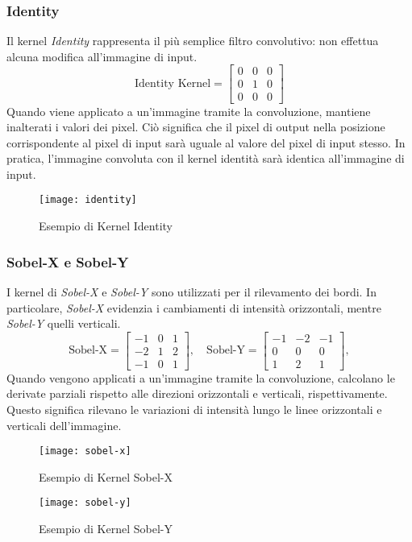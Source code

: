 \subsubsection{Identity}
Il kernel \textit{Identity} rappresenta il più semplice filtro convolutivo: non effettua alcuna modifica all'immagine di input.\newline
\begin{equation*}
	\text {Identity Kernel} = 
	\begin{bmatrix}
		0 & 0 & 0 \\
		0 & 1 & 0 \\
		0 & 0 & 0
	\end{bmatrix}
\end{equation*}
\newline Quando viene applicato a un'immagine tramite la convoluzione, mantiene inalterati i valori dei pixel. Ciò significa che il pixel di output nella posizione corrispondente al pixel di input sarà uguale al valore del pixel di input stesso. In pratica, l'immagine convoluta con il kernel identità sarà identica all'immagine di input.
 \begin{figure}[H]
	\centering
	\texttt{[image: identity]}
	\caption{Esempio di Kernel Identity}
\end{figure}
\subsubsection{Sobel-X e Sobel-Y}
I kernel di \textit{Sobel-X} e \textit{Sobel-Y} sono utilizzati per il rilevamento dei bordi. In particolare, \textit{Sobel-X} evidenzia i cambiamenti di intensità orizzontali, mentre \textit{Sobel-Y} quelli verticali.\newline
\begin{equation*}
	\text {Sobel-X} = 
	\begin{bmatrix}
		-1 & 0 & 1 \\
		-2 & 1 & 2 \\
		-1 & 0 & 1
	\end{bmatrix},
	\quad
	\text {Sobel-Y} = 
	\begin{bmatrix}
		-1 & -2 & -1 \\
		0 & 0 & 0 \\
		1 & 2 & 1
	\end{bmatrix},
\end{equation*}
\newline Quando vengono applicati a un'immagine tramite la convoluzione, calcolano le derivate parziali rispetto alle direzioni orizzontali e verticali, rispettivamente. Questo significa rilevano le variazioni di intensità lungo le linee orizzontali e verticali dell'immagine.
\begin{figure}[H]
	\centering
	\texttt{[image: sobel-x]}
	\caption{Esempio di Kernel Sobel-X}
\end{figure}
\begin{figure}[H]
	\centering
	\texttt{[image: sobel-y]}
	\caption{Esempio di Kernel Sobel-Y}
\end{figure}
